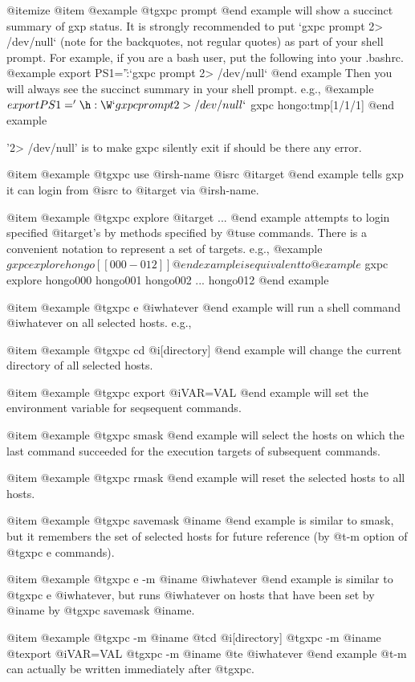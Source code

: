 @itemize
@item 
@example
@t{gxpc prompt}
@end example
will show a succinct summary of gxp status.  It is strongly
recommended to put `gxpc prompt 2> /dev/null` 
(note for the backquotes, not regular
quotes) as part of your shell prompt. For example, if you are a bash
user, put the following into your .bashrc.
@example
export PS1='\h:\W`gxpc prompt 2> /dev/null`%
@end example
Then you will always see the succinct summary in your shell prompt. e.g.,
@example
$ export PS1='\h:\W`gxpc prompt 2> /dev/null`%
$ gxpc
hongo:tmp[1/1/1]%
@end example

'2> /dev/null' is to make gxpc silently exit if should be there any
error.

@item 
@example
@t{gxpc use} @i{rsh-name} @i{src} @i{target}
@end example
tells gxp it can login
from @i{src} to @i{target} via @i{rsh-name}. 

@item
@example
@t{gxpc explore} @i{target} ...
@end example
attempts to login specified @i{target}'s by methods specified by @t{use} 
commands.
There is a convenient notation to represent a set of targets. e.g.,
@example
$ gxpc explore hongo[[000-012]]
@end example
is equivalent to
@example
$ gxpc explore hongo000 hongo001 hongo002 ... hongo012
@end example

@item 
@example
@t{gxpc e} @i{whatever}
@end example
will run a shell command @i{whatever} on 
all selected hosts. e.g.,

@item 
@example
@t{gxpc cd} @i{[directory]}
@end example
will change the current directory of all selected hosts. 

@item 
@example
@t{gxpc export} @i{VAR=VAL}
@end example
will set the environment variable for seqsequent commands. 

@item 
@example
@t{gxpc smask}
@end example
will select the hosts on which the last command succeeded
for the execution targets of subsequent commands.

@item 
@example
@t{gxpc rmask}
@end example
will reset the selected hosts to all hosts.

@item 
@example
@t{gxpc savemask} @i{name}
@end example
is similar to smask, but it remembers the set of selected hosts
for future reference (by @t{-m} option of @t{gxpc e} commands).

@item 
@example
@t{gxpc e} -m @i{name} @i{whatever}
@end example
is similar to @t{gxpc e} @i{whatever}, but runs @i{whatever} on
hosts that have been set by @i{name} by @t{gxpc savemask} @i{name}.

@item 
@example
@t{gxpc -m} @i{name} @t{cd} @i{[directory]}
@t{gxpc -m} @i{name} @t{export} @i{VAR=VAL}
@t{gxpc -m} @i{name} @t{e} @i{whatever}
@end example
@t{-m} can actually be written immediately after @t{gxpc}.

